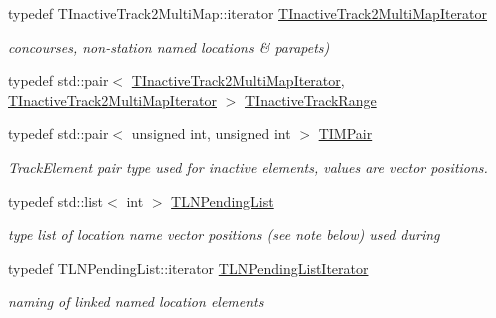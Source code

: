 \begin{DoxyCompactItemize}
typedef T\+Inactive\+Track2\+Multi\+Map\+::iterator \mbox{\hyperlink{class_t_track_a6072881896a545945cbcc26e8307bb68}{T\+Inactive\+Track2\+Multi\+Map\+Iterator}}
\begin{DoxyCompactList}\small\item\em concourses, non-\/station named locations \& parapets) \end{DoxyCompactList}\item 
typedef std\+::pair$<$ \mbox{\hyperlink{class_t_track_a6072881896a545945cbcc26e8307bb68}{T\+Inactive\+Track2\+Multi\+Map\+Iterator}}, \mbox{\hyperlink{class_t_track_a6072881896a545945cbcc26e8307bb68}{T\+Inactive\+Track2\+Multi\+Map\+Iterator}} $>$ \mbox{\hyperlink{class_t_track_a1ac6dda244b2f5a6e27a458f28fc1b1c}{T\+Inactive\+Track\+Range}}
\item 
\mbox{\label{class_t_track_ae0a83809dc6f3dabb0f8fd8e9464ac70}} 
typedef std\+::pair$<$ unsigned int, unsigned int $>$ \mbox{\hyperlink{class_t_track_ae0a83809dc6f3dabb0f8fd8e9464ac70}{T\+I\+M\+Pair}}
\begin{DoxyCompactList}\small\item\em Track\+Element pair type used for inactive elements, values are vector positions. \end{DoxyCompactList}\item 
\mbox{\label{class_t_track_a4f32231e16e5bdb3485a8f2d51cf27f6}} 
typedef std\+::list$<$ int $>$ \mbox{\hyperlink{class_t_track_a4f32231e16e5bdb3485a8f2d51cf27f6}{T\+L\+N\+Pending\+List}}
\begin{DoxyCompactList}\small\item\em type list of location name vector positions (see note below) used during \end{DoxyCompactList}\item 
\mbox{\label{class_t_track_a5fe44ea483c447ec227dc2015ffff40c}} 
typedef T\+L\+N\+Pending\+List\+::iterator \mbox{\hyperlink{class_t_track_a5fe44ea483c447ec227dc2015ffff40c}{T\+L\+N\+Pending\+List\+Iterator}}
\begin{DoxyCompactList}\small\item\em naming of linked named location elements \end{DoxyCompactList}\item 
\mbox{\label{class_t_track_a3005ddcbe9fd2a56040a8a66e6dc0b61}} 

\end{DoxyCompactItemize}
